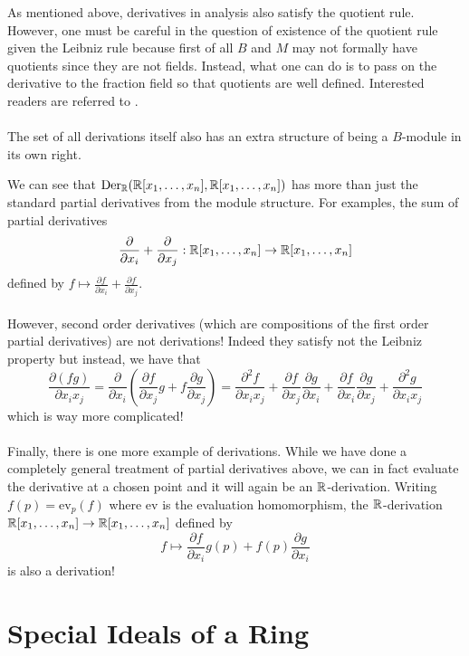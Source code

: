\documentclass[a4paper]{article}
\begin{document}
As mentioned above, derivatives in analysis also satisfy the quotient rule. However, one must be careful in the question of existence of the quotient rule given the Leibniz rule because first of all $B$ and $M$ may not formally have quotients since they are not fields. Instead, what one can do is to pass on the derivative to the fraction field so that quotients are well defined. Interested readers are referred to \cite{Zar-Sam}. \\~\\

The set of all derivations itself also has an extra structure of being a $B$-module in its own right. 

We can see that $\text{Der}_{\mathbb{R}}(\mathbb{R}[x_1,\dots,x_n],\mathbb{R}[x_1,\dots,x_n])$ has more than just the standard partial derivatives from the module structure. For examples, the sum of partial derivatives $$\frac{\partial}{\partial x_i}+\frac{\partial}{\partial x_j}:\mathbb{R}[x_1,\dots,x_n]\to\mathbb{R}[x_1,\dots,x_n]$$ defined by $f\mapsto\frac{\partial f}{\partial x_i}+\frac{\partial f}{\partial x_j}$. \\~\\

However, second order derivatives (which are compositions of the first order partial derivatives) are not derivations! Indeed they satisfy not the Leibniz property but instead, we have that $$\frac{\partial (fg)}{\partial x_ix_j}=\frac{\partial}{\partial x_i}\left(\frac{\partial f}{\partial x_j}g+f\frac{\partial g}{\partial x_j}\right)=\frac{\partial^2 f}{\partial x_ix_j}+\frac{\partial f}{\partial x_j}\frac{\partial g}{\partial x_i}+\frac{\partial f}{\partial x_i}\frac{\partial g}{\partial x_j}+\frac{\partial^2g}{\partial x_ix_j}$$ which is way more complicated! \\~\\

Finally, there is one more example of derivations. While we have done a completely general treatment of partial derivatives above, we can in fact evaluate the derivative at a chosen point and it will again be an $\mathbb{R}$-derivation. Writing $f(p)=\text{ev}_p(f)$ where $\text{ev}$ is the evaluation homomorphism, the $\mathbb{R}$-derivation $\mathbb{R}[x_1,\dots,x_n]\to\mathbb{R}[x_1,\dots,x_n]$ defined by $$f\mapsto \frac{\partial f}{\partial x_i}g(p)+f(p)\frac{\partial g}{\partial x_i}$$ is also a derivation! 

\pagebreak
\section{Special Ideals of a Ring}
\end{document}
